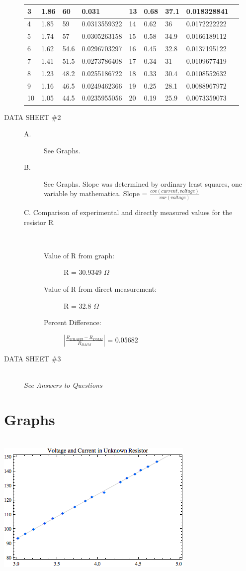 \documentclass{article}
\begin{document}
\begin{description}
\begin{samepage}
{{\begin{center}
\begin{tabular}{| l | l | l | l | l | l | l | l | l |}
	3	&1.86	&	60	&	0.031		&13	&	0.68	&	37.1	&	0.018328841\\ \hline
	4	&1.85	&	59	&	0.0313559322	&14	&	0.62	&	36	&	0.0172222222\\ \hline
	5	&1.74	&	57	&	0.0305263158	&15	&	0.58	&	34.9	&	0.0166189112\\ \hline
	6	&1.62	&	54.6	&	0.0296703297	&16	&	0.45	&	32.8	&	0.0137195122\\ \hline
	7	&1.41	&	51.5	&	0.0273786408	&17	&	0.34	&	31	&	0.0109677419\\ \hline	
	8	&1.23	&	48.2	&	0.0255186722	&18	&	0.33	&	30.4	&	0.0108552632\\ \hline
	9	&1.16	&	46.5	&	0.0249462366	&19	&	0.25	&	28.1	&	0.0088967972\\ \hline
	10	&1.05	&	44.5	&	0.0235955056	&20	&	0.19	&	25.9	&	0.0073359073\\ \hline

	\end{tabular}
\end{center}
}}
\end{samepage}
\item[DATA SHEET \#2] \hfill
\begin{description}
\item[A.] See Graphs.
\item[B.] See Graphs.  Slope was determined by ordinary least squares, one variable by mathematica.  Slope = $\frac{cov(current,voltage)}{var(voltage)} $
\item[C. Comparison of experimental and directly measured values for the resistor R]\
\begin{description}
\item[Value of R from graph: ] R = 30.9349 $\Omega$\
\item[Value of R from direct measurement: ] R = 32.8 $\Omega$\
\item[Percent Difference: ] $|\frac{R_{GRAPH} - R_{DMM}}{R_{DMM}}|$ = 0.05682\
\end{description}
\end{description}
\item[DATA SHEET \#3] \hfill \\
{\it{See Answers to Questions}}
\end{description}
\section{Graphs}\hfill\\
\includegraphics{lab4_graph_1}\\
\end{document}
